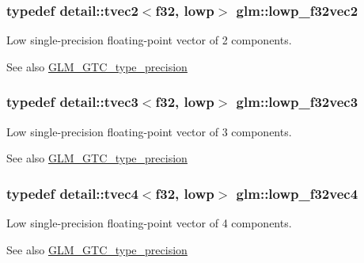 \subsubsection[{\texorpdfstring{lowp\+\_\+f32vec2}{lowp_f32vec2}}]{\setlength{\rightskip}{0pt plus 5cm}typedef detail\+::tvec2$<$f32, lowp$>$ {\bf glm\+::lowp\+\_\+f32vec2}}\hypertarget{group__gtc__type__precision_ga7faa2c9884c87b1e6512a966adad69e4}{}\label{group__gtc__type__precision_ga7faa2c9884c87b1e6512a966adad69e4}
Low single-\/precision floating-\/point vector of 2 components. \begin{DoxySeeAlso}{See also}
\hyperlink{group__gtc__type__precision}{G\+L\+M\+\_\+\+G\+T\+C\+\_\+type\+\_\+precision} 
\end{DoxySeeAlso}
\subsubsection[{\texorpdfstring{lowp\+\_\+f32vec3}{lowp_f32vec3}}]{\setlength{\rightskip}{0pt plus 5cm}typedef detail\+::tvec3$<$f32, lowp$>$ {\bf glm\+::lowp\+\_\+f32vec3}}\hypertarget{group__gtc__type__precision_ga1f878d91a5f5ab92c756244b62af7248}{}\label{group__gtc__type__precision_ga1f878d91a5f5ab92c756244b62af7248}
Low single-\/precision floating-\/point vector of 3 components. \begin{DoxySeeAlso}{See also}
\hyperlink{group__gtc__type__precision}{G\+L\+M\+\_\+\+G\+T\+C\+\_\+type\+\_\+precision} 
\end{DoxySeeAlso}
\subsubsection[{\texorpdfstring{lowp\+\_\+f32vec4}{lowp_f32vec4}}]{\setlength{\rightskip}{0pt plus 5cm}typedef detail\+::tvec4$<$f32, lowp$>$ {\bf glm\+::lowp\+\_\+f32vec4}}\hypertarget{group__gtc__type__precision_ga59f7292d7ed0b7df72e6aa31010e2648}{}\label{group__gtc__type__precision_ga59f7292d7ed0b7df72e6aa31010e2648}
Low single-\/precision floating-\/point vector of 4 components. \begin{DoxySeeAlso}{See also}
\hyperlink{group__gtc__type__precision}{G\+L\+M\+\_\+\+G\+T\+C\+\_\+type\+\_\+precision} 
\end{DoxySeeAlso}
